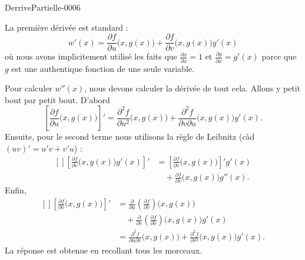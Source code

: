 
\begin{corrige}{DerrivePartielle-0006}

	La première dérivée est standard :
	\begin{equation}
		w'(x)=\frac{ \partial f }{ \partial u }\big( x,g(x) \big)+\frac{ \partial f }{ \partial v }\Big( x,g(x) \Big)g'(x)
	\end{equation}
	où nous avons implicitement utilisé les faits que $\frac{ \partial x }{ \partial x }=1$ et $\frac{ \partial g }{ \partial x }=g'(x)$ parce que $g$ est une authentique fonction de une seule variable.

	Pour calculer $w''(x)$, nous devons calculer la dérivée de tout cela. Allons y petit bout par petit bout. D'abord
	\begin{equation}
		\left[ \frac{ \partial f }{ \partial u }\Big( x,g(x) \Big) \right]'=\frac{ \partial^2f  }{ \partial u^2 }\Big( x,g(x) \Big)+\frac{ \partial^2f }{ \partial v\partial u }\Big( x,g(x) \Big)g'(x).
	\end{equation}
	Ensuite, pour le second terme nous utilisons la règle de Leibnitz (càd $(uv)'=u'v+v'u$) :
	\begin{equation}
		\begin{aligned}[]
			\left[  \frac{ \partial f }{ \partial v }\Big( x,g(x) \Big)g'(x) \right]'&=\left[ \frac{ \partial f }{ \partial v }\Big( x,g(x) \Big) \right]'g'(x)\\
			&\quad +\frac{ \partial f }{ \partial v }\Big( x,g(x) \Big)g''(x).
		\end{aligned}
	\end{equation}
	Enfin,
	\begin{equation}
		\begin{aligned}[]
			\left[ \frac{ \partial f }{ \partial v }\Big( x,g(x) \Big) \right]'&=\frac{ \partial  }{ \partial u }\left( \frac{ \partial f }{ \partial v } \right)\Big( x,g(x) \Big)\\
			&\quad +\frac{ \partial  }{ \partial v }\left( \frac{ \partial f }{ \partial v } \right)\Big( x,g(x) \Big)g'(x)\\
			&=\frac{ \partial^2f  }{ \partial u\partial v }\Big( x,g(x) \Big)+\frac{ \partial^2f }{ \partial v^2 }\Big( x,g(x) \Big)g'(x).
		\end{aligned}
	\end{equation}
	La réponse est obtenue en recollant tous les morceaux.
	

\end{corrige}
